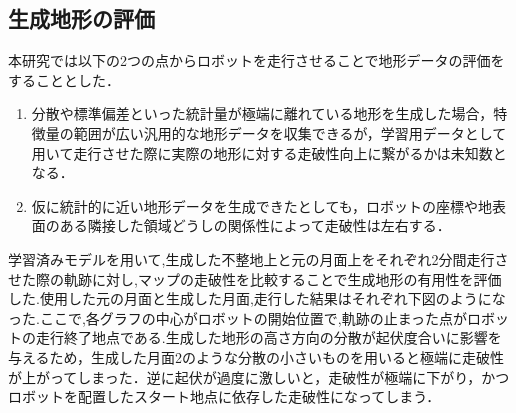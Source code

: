 \subsection{生成地形の評価}
本研究では以下の2つの点からロボットを走行させることで地形データの評価をすることとした．
\begin{enumerate}
  \item 分散や標準偏差といった統計量が極端に離れている地形を生成した場合，特徴量の範囲が広い汎用的な地形データを収集できるが，学習用データとして用いて走行させた際に実際の地形に対する走破性向上に繋がるかは未知数となる．
  \item 仮に統計的に近い地形データを生成できたとしても，ロボットの座標や地表面のある隣接した領域どうしの関係性によって走破性は左右する．
\end{enumerate}
学習済みモデルを用いて,生成した不整地上と元の月面上をそれぞれ2分間走行させた際の軌跡に対し,マップの走破性を比較することで生成地形の有用性を評価した.使用した元の月面と生成した月面,走行した結果はそれぞれ下図のようになった.ここで,各グラフの中心がロボットの開始位置で,軌跡の止まった点がロボットの走行終了地点である.生成した地形の高さ方向の分散が起伏度合いに影響を与えるため，生成した月面2のような分散の小さいものを用いると極端に走破性が上がってしまった．逆に起伏が過度に激しいと，走破性が極端に下がり，かつロボットを配置したスタート地点に依存した走破性になってしまう．

